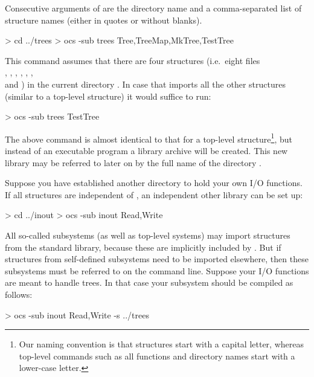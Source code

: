 Consecutive arguments of  are the directory name and a
comma-separated list of structure names (either in quotes or without
blanks). 

\begin{prog}
> cd ../trees
> ocs -sub trees Tree,TreeMap,MkTree,TestTree
\end{prog}

This command assumes that there are four structures (i.e.\ eight files
\\ , 
, 
  , 
, 
, 
, \\  and
) in the current directory . In case
that  imports all the other structures (similar to a
top-level structure) it would suffice to run: 

\begin{prog}
> ocs -sub trees TestTree
\end{prog}

The above command is almost identical to that for a top-level
structure\footnote{Our naming convention is that \opal{} structures start
  with a capital letter, whereas top-level
  commands such as all \opal{} functions and directory names start with
  a lower-case letter.},
but instead of an executable program a library archive 
will be created. This new library may be referred to later on by the full
name of the directory .

Suppose you have established another directory  to hold
your own I/O functions. If all structures are independent of , an
independent other library can be set up:

\begin{prog}
> cd ../inout
> ocs -sub inout Read,Write
\end{prog}

All so-called subsystems (as well as top-level systems) may import
structures from the standard \opal{} 
library, because these are implicitly included by . But if
structures from self-defined subsystems need to be imported elsewhere, then these
subsystems must be referred to on the  command line. Suppose your
I/O functions are meant to handle trees. In that case your subsystem
 should be compiled as follows:

\begin{prog}
> ocs -sub inout Read,Write -s ../trees
\end{prog}

